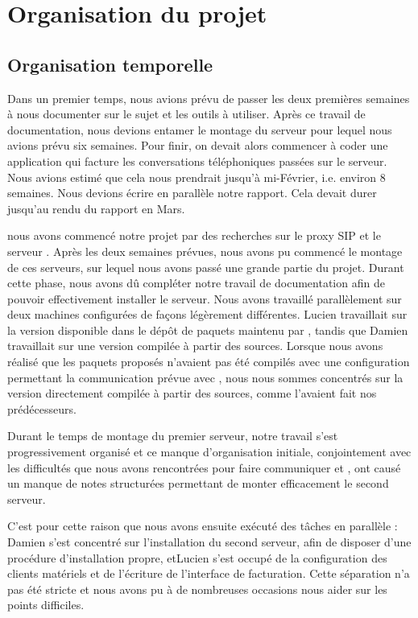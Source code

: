 \section{Organisation du projet}

\subsection{Organisation temporelle}




Dans un premier temps, nous avions prévu de passer les deux premières semaines à nous documenter sur le sujet et les outils à utiliser. Après ce travail de documentation, nous devions entamer le montage du serveur pour lequel nous avions prévu six semaines. Pour finir, on devait alors commencer à coder une application qui facture les conversations téléphoniques passées sur le serveur. Nous avions estimé que cela nous prendrait jusqu'à mi-Février, i.e. environ 8 semaines. Nous devions écrire en parallèle notre rapport. Cela devait durer jusqu'au rendu du rapport en Mars. 

 nous avons commencé notre projet par des recherches sur le proxy SIP {\kam} et le serveur {\frad}. Après les deux semaines prévues, nous avons pu commencé le montage de ces serveurs, sur lequel nous avons passé une grande partie du projet. Durant cette phase, nous avons dû compléter notre travail de documentation afin de pouvoir effectivement installer le serveur.
Nous avons travaillé parallèlement sur deux machines configurées de façons légèrement différentes. Lucien travaillait sur la version disponible dans le dépôt de paquets maintenu par {\kam}, tandis que Damien travaillait sur une version compilée à partir des sources. Lorsque nous avons réalisé que les paquets proposés n’avaient pas été compilés avec une configuration permettant la communication prévue avec {\frad}, nous nous sommes concentrés sur la version directement compilée à partir des sources, comme l’avaient fait nos prédécesseurs.

Durant le temps de montage du premier serveur, notre travail s’est progressivement organisé et ce manque d’organisation initiale, conjointement avec les difficultés que nous avons rencontrées pour faire communiquer {\kam} et {\frad}, ont causé un manque de notes structurées permettant de monter efficacement le second serveur.


C’est pour cette raison que nous avons ensuite exécuté des tâches en parallèle : Damien s’est concentré sur l’installation du second serveur, afin de disposer d’une procédure d’installation propre, et Lucien s’est occupé de la configuration des clients matériels et de l’écriture de l’interface de facturation. Cette séparation n’a pas été stricte et nous avons pu à de nombreuses occasions nous aider sur les points difficiles.

